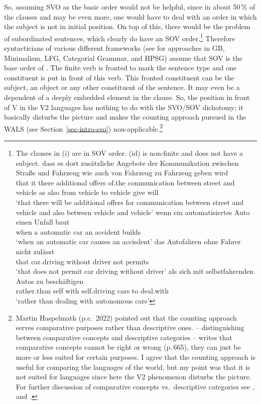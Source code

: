 So, assuming
SVO as the basic order would not be helpful, since in about 50\,\% of the clauses and may be even
more, one would have to deal with an order in which the subject is not in initial position. On top of
this, there would be the problem of subordinated sentences, which clearly do have an SOV
order.\footnote{
The clauses in (i) are in SOV order. (id) is non-finite and does not have a subject.
\eal
\ex 
\gll dass es dort zusätzliche Angebote der Kommunikation zwischen Straße und Fahrzeug wie auch von Fahrzeug zu Fahrzeug geben wird\\
     that it there additional offers   of.the communication between street and vehicle as also from vehicle to vehicle give will\\
\glt `that there will be additional offers for communication between street and vehicle and also
between vehicle and vehicle'
\ex 
\gll wenn ein automatisiertes Auto einen Unfall baut\\
     when a   automatic       car  an accident  builds\\
\glt `when an automatic car causes an accisdent'
\ex 
\gll das Autofahren ohne Fahrer nicht zulässt\\
     that car.driving without driver not permits\\
\glt `that does not permit car driving without driver'
\ex
\gll als sich mit selbstfahrenden Autos zu beschäftigen\\
     rather.than self with self.driving cars to deal.with\\
\glt `rather than dealing with autonomous cars'
\zllast
}
 Therefore syntacticians of various different frameworks (see \citealp{MuellerGT-Eng} for
approaches in GB, Minimalism, LFG, Categorial Grammar, and HPSG) assume that SOV is the base order of
. The finite verb is fronted to mark the sentence type and one constituent is put in front of
this verb. This fronted constituent can be the subject, an object or any other constituent of the
sentence. It may even be a dependent of a deeply embedded element in the clause. So, the position
in front of V in the V2 languages has nothing to do with the SVO/SOV dichotomy; it basically disturbs
the picture and makes the counting approach pursued in the WALS (see Section~\ref{sec-intro-svo})
non-applicable.\footnote{
  Martin Haspelmath (p.c.\ 2022) pointed out that the counting approach serves comparative
  purposes rather than descriptive ones. \citet{Haspelmath2010a} -- distinguishing between comparative concepts and descriptive
  categories -- writes that comparative concepts cannot be right or wrong (p.\,665), they can just be more or
  less suited for certain purposes. I agree that the counting approach is useful for comparing the
  languages of the world, but my point was that it is not suited for  languages since here
  the V2 phenomenon disturbs the picture. For further discussion of comparative concepts vs.\ descriptive categories
  see ,  and .
}

